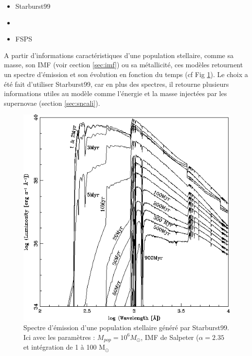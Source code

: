 \begin{itemize}
\item Starburst99 \cite{leitherer_starburst99:_1999} 
\item \cite{2003MNRAS.344.1000B}
\item FSPS \cite{2009ApJ...699..486C}
\end{itemize}

A partir d'informations caractéristiques d'une population stellaire, comme sa masse, son \ac{IMF} (voir cection \ref{sec:imf}) ou sa métallicité, ces modèles retournent un spectre d'émission et son évolution en fonction du temps (cf Fig \ref{fig:spectre_starburst}).
Le choix a été fait d'utiliser Starburst99, car en plus des spectres, il retourne plusieurs informations utiles au modèle comme l'énergie et la masse injectées par les supernovae (section \ref{sec:sncali}).

\begin{figure}
        \includegraphics[width=.95\linewidth]{img/03/spectre_starburst.jpg} 
        \caption[Spectres Starburst99]{Spectre d'émission d'une population stellaire généré par Starburst99.
        Ici avec les paramètres : $M_{pop}=10^6 M_\odot$, \ac{IMF} de Salpeter ($\alpha=2.35$ et intégration de 1 à 100 M$_\odot$ 
 		\label{fig:spectre_starburst}}
\end{figure}


